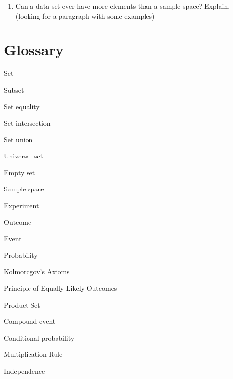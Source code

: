 \begin{enumerate}
   \item Can a data set ever have more elements than a sample space? Explain. (looking for a paragraph with some examples)
    
\end{enumerate}

\section{Glossary}
\begin{Glossary}
\item[Set]
\item[Subset]
\item[Set equality]
\item[Set intersection]
\item[Set union]
\item[Universal set]
\item[Empty set]
\item[Sample space]
\item[Experiment]
\item[Outcome]
\item[Event]
\item[Probability]
\item[Kolmorogov's Axioms]
\item[Principle of Equally Likely Outcomes]
\item[Product Set]
\item[Compound event]
\item[Conditional probability]
\item[Multiplication Rule]
\item[Independence]


\end{Glossary}



